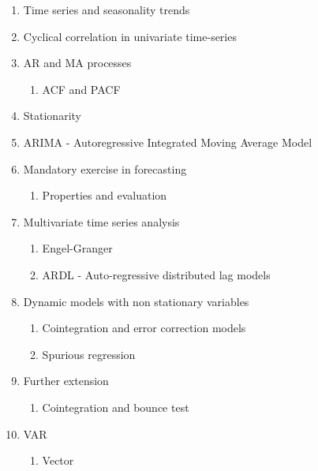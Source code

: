 \documentclass[
]{book}
\providecommand{\tightlist}{%
  \setlength{\itemsep}{0pt}\setlength{\parskip}{0pt}}
\begin{document}
\begin{enumerate}
\def\labelenumi{\arabic{enumi}.}
\tightlist
\item
  Time series and seasonality trends
\item
  Cyclical correlation in univariate time-series
\item
  AR and MA processes

  \begin{enumerate}
  \def\labelenumii{\arabic{enumii}.}
  \tightlist
  \item
    ACF and PACF
  \end{enumerate}
\item
  Stationarity
\item
  ARIMA - Autoregressive Integrated Moving Average Model
\item
  Mandatory exercise in forecasting

  \begin{enumerate}
  \def\labelenumii{\arabic{enumii}.}
  \tightlist
  \item
    Properties and evaluation
  \end{enumerate}
\item
  Multivariate time series analysis

  \begin{enumerate}
  \def\labelenumii{\arabic{enumii}.}
  \tightlist
  \item
    Engel-Granger
  \item
    ARDL - Auto-regressive distributed lag models
  \end{enumerate}
\item
  Dynamic models with non stationary variables

  \begin{enumerate}
  \def\labelenumii{\arabic{enumii}.}
  \tightlist
  \item
    Cointegration and error correction models
  \item
    Spurious regression
  \end{enumerate}
\item
  Further extension

  \begin{enumerate}
  \def\labelenumii{\arabic{enumii}.}
  \tightlist
  \item
    Cointegration and bounce test
  \end{enumerate}
\item
  VAR

  \begin{enumerate}
  \def\labelenumii{\arabic{enumii}.}
  \tightlist
  \item
    Vector
  \end{enumerate}
\end{enumerate}
\end{document}
